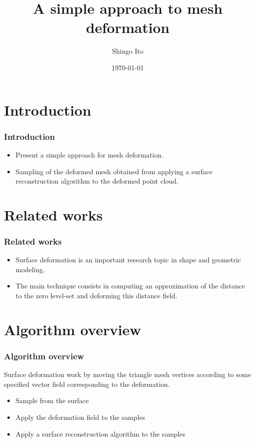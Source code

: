 \documentclass{beamer}
\title{A simple approach to mesh deformation}
\author{Shingo Ito}
\institute{s1200045}
\date{\today}
\begin{document}
\titlepage


\section{Introduction}


\begin{frame}
	\frametitle{Introduction}
	\Large
	\begin{itemize}
   \item Present a simple approach for mesh deformation.
		\item Sampling of the deformed mesh obtained from applying a surface reconstruction algorithm to the deformed point cloud. \\
		\end{itemize}
\end{frame}
\section{Related works}
\begin{frame}
\frametitle{Related works}
\Large
\begin{itemize}
\item Surface deformation is an important research topic in shape and geometric modeling.
\item The main technique consists in computing an approximation of the distance to the zero level-set and deforming this distance field.
\end{itemize}
\end{frame}

\section{Algorithm overview}
\begin{frame}
	\frametitle{Algorithm overview}
	\Large
Surface deformation work by moving the triangle mesh vertices according to some specified vector field corresponding to the deformation.
		\begin{itemize}
			\item Sample from the surface
			\item Apply the deformation field to the samples
			\item Apply a surface reconstruction algorithm to the samples
			\end{itemize}
\end{frame}
\end{document}
